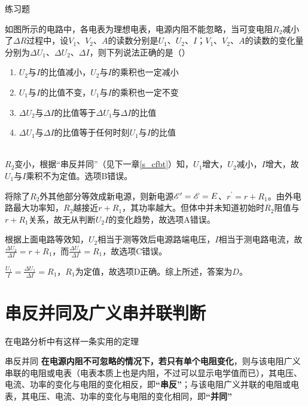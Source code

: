 \begin{ep}{练习题}{}



如图所示的电路中，各电表为理想电表，电源内阻不能忽略，当可变电阻$R_2$减小了$\Delta R$过程中，设$V_1$、$V_2$、$A$的读数分别是$U_1$、$U_2$、$I$；$V_1$、$V_2$、$A$的读数的变化量分别为$\Delta U_1$、$\Delta U_2$、$\Delta I$，则下列说法正确的是（）

\begin{enumerate}[label=(\Alph*)]
  \item $U_2$与$I$的比值减小，$U_2$与$I$的乘积也一定减小
  \item $U_1$与$I$的比值不变，$U_1$与$I$的乘积也一定不变
  \item $\Delta U_2$与$\Delta I$的比值等于$\Delta U_1$与$\Delta I$的比值
  \item $\Delta U_1$与$\Delta I$的比值等于任何时刻$U_1$与$I$的比值
\end{enumerate}

~\\
$R_2$变小，根据“串反并同”（见下一章\eqref{s_cfbt}）知，$U_1$增大，$U_2$减小，$I$增大，故$U_1$与$I$乘积不为定值。选项B错误。

将除了$R_2$外其他部分等效成新电源，则新电源$\mathscr{E}^{\prime} = \mathscr{E} = E$、$r^{\prime} = r + R_1$。由外电路最大功率知，$R_2$越接近$r + R_1$，其功率越大。但体中并未知道初始时$R_2$阻值与$r + R_1$关系，故无从判断$U_2 I$的变化趋势，故选项A错误。

根据上面电路等效知，$U_2$相当于测等效后电源路端电压，$I$相当于测电路电流，故$\frac{\Delta U_2}{\Delta I} = r + R_1$，而$\frac{\Delta U_1}{\Delta I} = R_1$，故选项C错误。

$\frac{U_1}{I} = \frac{\Delta U_1}{\Delta I} = R_1$，$R_1$为定值，故选项D正确。综上所述，答案为$D$。
\end{ep}

\section{串反并同及广义串并联判断}
\label{s_cfbt}

在电路分析中有这样一条实用的定理

\begin{theo}{串反并同}{}
\textbf{在电源内阻不可忽略的情况下，若只有单个电阻变化}，则与该电阻广义串联的电阻或电表（电表本质上也是内阻，不过可以显示电学值而已），其电压、电流、功率的变化与电阻的变化相反，即\textbf{“串反”}；与该电阻广义并联的电阻或电表，其电压、电流、功率的变化与电阻的变化相同，即\textbf{“并同”}
\end{theo}


